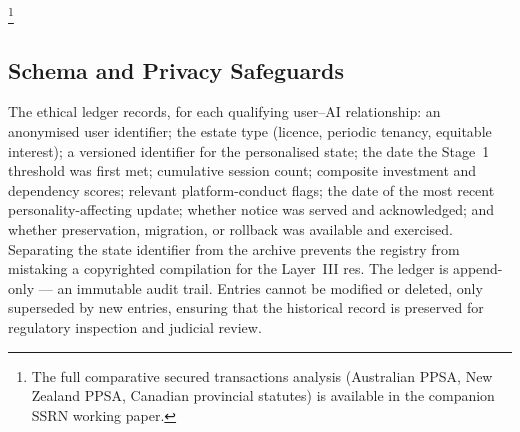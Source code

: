 \footnote{The full comparative secured transactions analysis (Australian PPSA, New Zealand PPSA, Canadian provincial statutes) is available in the companion SSRN working paper.}

\subsection{Schema and Privacy Safeguards}
\label{sec:schema}

The ethical ledger records, for each qualifying user--AI relationship: an anonymised user identifier; the estate type (licence, periodic tenancy, equitable interest); a versioned identifier for the personalised state; the date the Stage~1 threshold was first met; cumulative session count; composite investment and dependency scores; relevant platform-conduct flags; the date of the most recent personality-affecting update; whether notice was served and acknowledged; and whether preservation, migration, or rollback was available and exercised. Separating the state identifier from the archive prevents the registry from mistaking a copyrighted compilation for the Layer~III res. The ledger is append-only --- an immutable audit trail. Entries cannot be modified or deleted, only superseded by new entries, ensuring that the historical record is preserved for regulatory inspection and judicial review.

